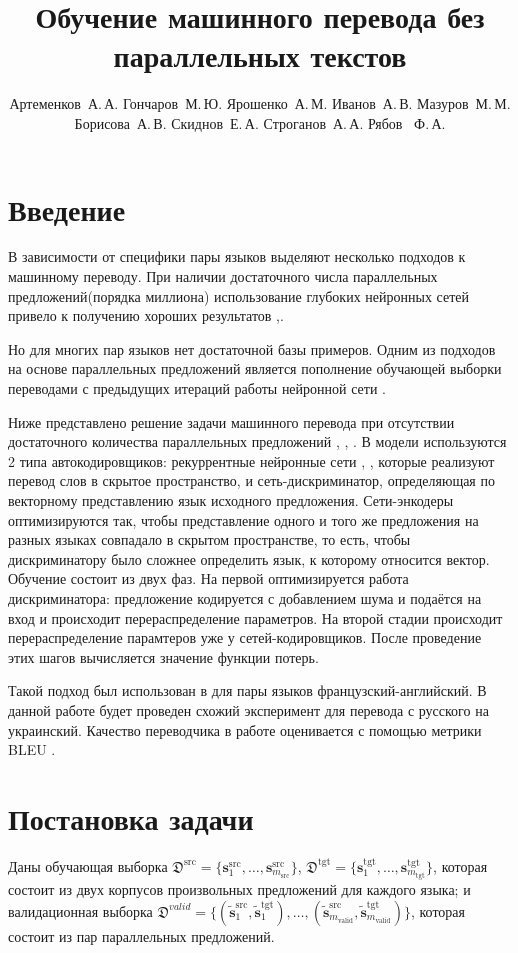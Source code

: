 \documentclass[12pt,twoside]{article}
\title
    [Обучение машинного перевода без параллельных текстов] %
    {Обучение машинного перевода без параллельных текстов}
\author
    [Артеменков~А.\,А$^1$. Гончаров~М.\,Ю.$^1$ Ярошенко~А.\,М.$^1$  Иванов~А.\,В.$^1$ Мазуров~М.\,М.$^1$ Борисова~А.\,В.$^1$ Скиднов~Е.\,А.$^1$ Строганов~А.\,А.$^1$ Рябов ~Ф.\,А.$^1$] %
{Артеменков~А.\,А. Гончаров~М.\,Ю. Ярошенко~А.\,М.  Иванов~А.\,В. Мазуров~М.\,М. Борисова~А.\,В. Скиднов~Е.\,А. Строганов~А.\,А. Рябов ~Ф.\,А.} %
[Артеменков~А.\,А. Гончаров~М.\,Ю. Ярошенко~А.\,М.  Иванов~А.\,В. Мазуров~М.\,М. Борисова~А.\,В. Скиднов~Е.\,А. Строганов~А.\,А. Рябов ~Ф.\,А.] %
\begin{document}
\maketitle

\section{Введение}

В зависимости от специфики пары языков выделяют несколько подходов к машинному переводу. При наличии достаточного числа параллельных предложений(порядка миллиона) использование глубоких нейронных сетей привело к получению хороших результатов \cite{zou2013bilingual},\cite{cho2014properties}. 

Но для многих пар языков нет достаточной базы примеров. Одним из подходов на основе параллельных предложений является пополнение обучающей выборки переводами с предыдущих итераций работы нейронной сети \cite{bertoldi2009domain}. 

Ниже представлено решение задачи машинного перевода при отсутствии достаточного количества параллельных предложений \cite{wu2016google}, \cite{sutskever2014sequence}, \cite{bahdanau2014neural}. В модели используются 2 типа автокодировщиков: рекуррентные нейронные сети \cite{gers1999learning}, \cite{graves2005framewise}, которые реализуют перевод слов в скрытое пространство, и сеть-дискриминатор, определяющая по векторному представлению язык исходного предложения. Сети-энкодеры оптимизируются так, чтобы представление одного и того же предложения на разных языках совпадало в скрытом пространстве, то есть, чтобы дискриминатору было сложнее определить язык, к которому относится вектор. Обучение состоит из двух фаз. На первой оптимизируется работа дискриминатора: предложение кодируется с добавлением шума \cite{kimimproving} и подаётся на вход и происходит перераспределение параметров. На второй стадии происходит перераспределение парамтеров уже у сетей-кодировщиков. После проведение этих шагов вычисляется значение функции потерь. 
 
Такой подход был использован в \cite{lample2017unsupervised} для пары языков французский-английский. В данной работе будет проведен схожий эксперимент для перевода с русского на украинский. Качество переводчика в работе оценивается с помощью метрики BLEU \cite{papineni2002bleu}.

\section{Постановка задачи}
Даны обучающая выборка $\mathfrak{D}^{\text{src}} = \{\mathbf{s}_1^{\text{src}}, \dots, \mathbf{s}_{m_\text{src}}^{\text{src}}\}$, $\mathfrak{D}^{\text{tgt}} = \{\mathbf{s}_1^{\text{tgt}}, \dots, \mathbf{s}_{m_\text{tgt}}^{\text{tgt}}\}$, которая состоит из двух корпусов произвольных предложений для каждого языка; и валидационная выборка $\mathfrak{D}^{valid} = \{(\mathbf{\tilde{s}}_1^{\text{src}}, \mathbf{\tilde{s}}_1^{\text{tgt}}), \dots, (\mathbf{\tilde{s}}_{m_{\text{valid}}}^{\text{src}}, \mathbf{\tilde{s}}_{m_{\text{valid}}}^{\text{tgt}})\}$, которая состоит из пар параллельных предложений.
\end{document}
